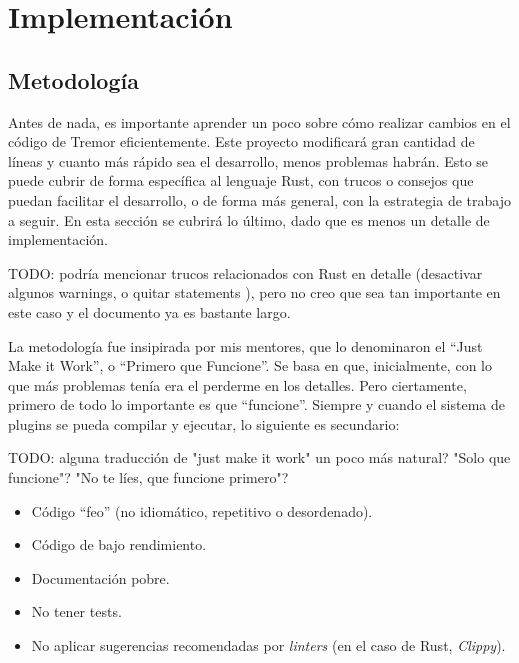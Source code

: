 
\chapter{Implementación}

\section{Metodología}

\newcommand{\work}{``Primero que Funcione''\xspace}

Antes de nada, es importante aprender un poco sobre cómo realizar cambios en el
código de Tremor eficientemente. Este proyecto modificará gran cantidad de
líneas y cuanto más rápido sea el desarrollo, menos problemas habrán. Esto se
puede cubrir de forma específica al lenguaje Rust, con trucos o consejos que
puedan facilitar el desarrollo, o de forma más general, con la estrategia de
trabajo a seguir. En esta sección se cubrirá lo último, dado que es menos un
detalle de implementación.

TODO: podría mencionar trucos relacionados con Rust en detalle (desactivar
algunos warnings, o quitar statements ), pero no creo que sea tan
importante en este caso y el documento ya es bastante largo.

La metodología fue insipirada por mis mentores, que lo denominaron el ``Just
Make it Work'', o \work. Se basa en que, inicialmente, con lo que más problemas
tenía era el perderme en los detalles. Pero ciertamente, primero de todo lo
importante es que ``funcione''. Siempre y cuando el sistema de plugins se pueda
compilar y ejecutar, lo siguiente es secundario:

TODO: alguna traducción de "just make it work" un poco más natural? "Solo que
funcione"? "No te líes, que funcione primero"?

\begin{itemize}
    \item Código ``feo'' (no idiomático, repetitivo o desordenado).

    \item Código de bajo rendimiento.

    \item Documentación pobre.

    \item No tener tests.

    \item No aplicar sugerencias recomendadas por \emph{linters} (en el caso de
        Rust, \emph{Clippy}).

\end{itemize}

